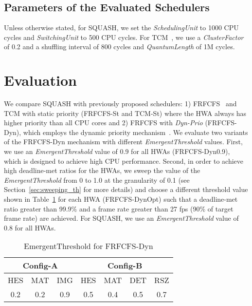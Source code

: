 \documentclass[10pt,letterpaper]{article}
\newcommand{\MODIFIEDISCA}[1]{#1}
\begin{document}
\subsection{Parameters of the Evaluated Schedulers}
Unless otherwise stated, for SQUASH, we set the {\it SchedulingUnit} to 1000 CPU cycles
and {\it SwitchingUnit} to 500 CPU cycles. 
For TCM~\cite{tcm}, we use a \emph{ClusterFactor} of 0.2
and a shuffling interval of 800 cycles and {\it QuantumLength} of
1M cycles.

 \section{Evaluation}\label{sec:evaluation} We compare SQUASH with previously
proposed schedulers: 1) FRFCFS~\cite{frfcfs} and TCM with static priority
(FRFCFS-St and \mbox{TCM-St}) where the HWA always has higher priority than all
CPU cores and 2) FRFCFS with \emph{Dyn-Prio} (FRFCFS-Dyn), which employs the
dynamic priority mechanism~\cite{schedulingCPUGPU}. \MODIFIEDISCA{We evaluate
two variants of the FRFCFS-Dyn mechanism with different {\it EmergentThreshold}
values. First, we use an {\it EmergentThreshold} value of 0.9 for all HWAs
(FRFCFS-Dyn0.9), which is designed to achieve high CPU performance. Second, in
order to achieve high deadline-met ratios for the HWAs, we sweep the value of
the {\it EmergentThreshold} from 0 to 1.0 at the granularity of 0.1 (see
Section~\ref{sec:sweeping_th} for more details) and choose a different threshold 
value shown in Table~\ref{tab:emergent_threshold} for each HWA (FRFCFS-DynOpt)
such that a deadline-met ratio greater than 99.9\% and a frame rate greater than
27 fps (90\% of target frame rate) are achieved.} For SQUASH, we use an {\it
EmergentThreshold} value of 0.8 for all HWAs.


\begin{table}[h!]
\scriptsize
  \centering
  \begin{tabular}{|c|c|c|c|c|c|c|}
    \hline
    \multicolumn{3}{|c|}{Config-A} & \multicolumn{4}{c|}{Config-B} \\
    \hline
    HES & MAT & IMG & HES & MAT & DET & RSZ \\
    \hline
    0.2 & 0.2 & 0.9 & 0.5 & 0.4 & 0.5 & 0.7 \\
    \hline
  \end{tabular}
  \vspace{-2mm}
  \caption{EmergentThreshold for FRFCFS-Dyn}
  \label{tab:emergent_threshold}
  \vspace{-3mm}
\end{table}
\end{document}
